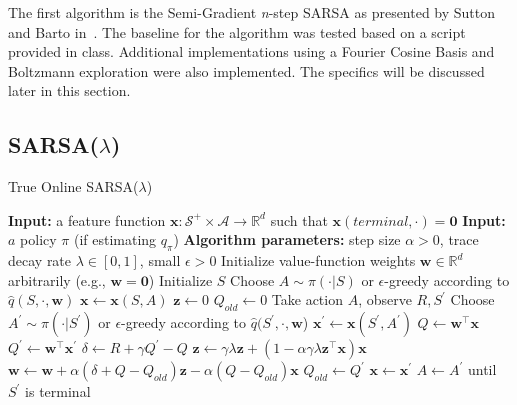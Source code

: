 \documentclass[journal]{IEEEtran}
\begin{document}
The first algorithm is the Semi-Gradient \emph{n}-step SARSA as presented by Sutton and Barto
in~\cite{sutton2018}. 
The baseline for the algorithm was tested based on a script provided in class.
Additional implementations using a Fourier Cosine Basis and Boltzmann exploration were 
also implemented. The specifics will be discussed later in this section.

\subsection[SARSA(Lambda)]{SARSA($\lambda$)}

\begin{algorithm}
    \caption{True Online SARSA(\(\lambda\))~\cite{sutton2018}}
    \label{alg:lambda_sarsa}
    \begin{algorithmic}\small
      \State \textbf{Input:} a feature function \(\mathbf{x}:\mathcal{S}^+\times\mathcal{A}
        \rightarrow\mathbb{R}^d\) such that \(\mathbf{x}(terminal,\cdot)=\mathbf{0}\)
      \State \textbf{Input:} \(a\) policy \(\pi\) (if estimating \(q_\pi\)) 
      \State \textbf{Algorithm parameters:} step size \(\alpha>0\),
      \State \quad trace decay rate \(\lambda\in[0,1]\), small \(\epsilon>0\)
      \State Initialize value-function weights \(\mathbf{w} \in \mathbb{R}^d\) arbitrarily 
          (e.g., \(\mathbf{w} = \mathbf{0}\)) 
        \State Initialize \(S\)
        \State Choose \(A\sim\pi(\cdot|S)\) or \(\epsilon\)-greedy according to 
            \(\hat{q}(S,\cdot,\mathbf{w})\)
        \State \(\mathbf{x} \leftarrow \mathbf{x}(S, A) \)
        \State \(\mathbf{z} \leftarrow 0\)
        \State \(Q_{old} \leftarrow 0\)
          \State Take action \(A\), observe \(R,S^\prime\)
          \State Choose \(A^\prime\sim\pi(\cdot|S^\prime)\) or \(\epsilon\)-greedy according to 
            \(\hat{q}(S^\prime,\cdot,\mathbf{w}\))
          \State \(\mathbf{x}^\prime \leftarrow \mathbf{x}(S^\prime,A^\prime)\)
          \State \(Q \leftarrow \mathbf{w}^\top\mathbf{x}\)
          \State \(Q^\prime \leftarrow \mathbf{w}^\top\mathbf{x}^\prime\)
          \State \(\delta \leftarrow R + \gamma Q^\prime - Q\)
          \State \(\mathbf{z} \leftarrow \gamma\lambda\mathbf{z} + (1-\alpha\gamma\lambda\mathbf{z}^\top\mathbf{x})\mathbf{x}\)
          \State \(\mathbf{w} \leftarrow \mathbf{w} + \alpha(\delta + Q - Q_{old})\mathbf{z} -\alpha(Q-Q_{old})\mathbf{x}\)
          \State \(Q_{old} \leftarrow Q^\prime\)
          \State \(\mathbf{x} \leftarrow \mathbf{x}^\prime\)
          \State \(A \leftarrow A^\prime\)
        \EndFor
        \State until \(S^\prime\) is terminal
      \EndFor
    \end{algorithmic}
\end{algorithm}
\end{document}
